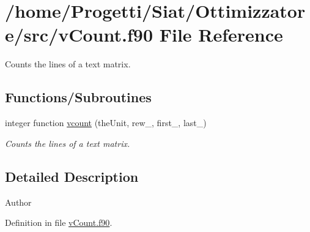 \hypertarget{v_count_8f90}{\section{/home/\-Progetti/\-Siat/\-Ottimizzatore/src/v\-Count.f90 File Reference}
\label{v_count_8f90}
}


Counts the lines of a text matrix.  


\subsection*{Functions/\-Subroutines}
\begin{DoxyCompactItemize}
\item 
integer function \hyperlink{v_count_8f90_a64dfa04178ad3ed3519dbac3c8540a81}{vcount} (the\-Unit, rew\-\_\-, first\-\_\-, last\-\_\-)
\begin{DoxyCompactList}\small\item\em Counts the lines of a text matrix. \end{DoxyCompactList}\end{DoxyCompactItemize}


\subsection{Detailed Description}
\begin{DoxyAuthor}{Author}

\end{DoxyAuthor}


Definition in file \hyperlink{v_count_8f90_source}{v\-Count.\-f90}.



